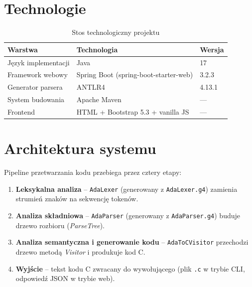 \documentclass[12pt,a4paper]{article}
\begin{document}
\section{Technologie}

\begin{table}[h!]
\centering
\begin{tabular}{lll}
\toprule
\textbf{Warstwa}       & \textbf{Technologia}                   & \textbf{Wersja} \\
\midrule
Język implementacji    & Java                                   & 17              \\
Framework webowy       & Spring Boot (spring-boot-starter-web)  & 3.2.3           \\
Generator parsera      & ANTLR4                                 & 4.13.1          \\
System budowania       & Apache Maven                           & ---             \\
Frontend               & HTML + Bootstrap 5.3 + vanilla JS      & ---             \\
\bottomrule
\end{tabular}
\caption{Stos technologiczny projektu}
\end{table}

\section{Architektura systemu}

Pipeline przetwarzania kodu przebiega przez cztery etapy:

\begin{enumerate}
  \item \textbf{Leksykalna analiza} -- \texttt{AdaLexer} (generowany z \texttt{AdaLexer.g4})
        zamienia strumień znaków na sekwencję tokenów.
  \item \textbf{Analiza składniowa} -- \texttt{AdaParser} (generowany z \texttt{AdaParser.g4})
        buduje drzewo rozbioru (\emph{ParseTree}).
  \item \textbf{Analiza semantyczna i generowanie kodu} -- \texttt{AdaToCVisitor}
        przechodzi drzewo metodą \emph{Visitor} i produkuje kod C.
  \item \textbf{Wyjście} -- tekst kodu C zwracany do wywołującego
        (plik \texttt{.c} w trybie CLI, odpowiedź JSON w trybie web).
\end{enumerate}
\end{document}
